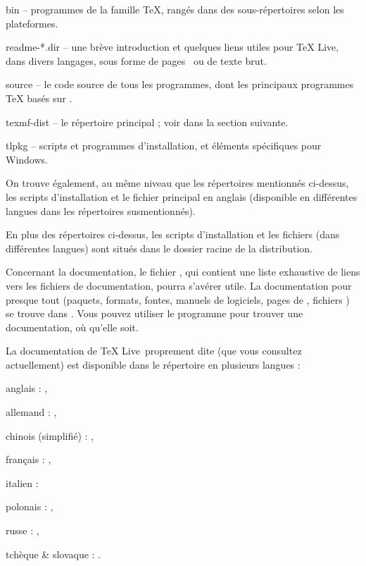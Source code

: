 \documentclass[german, english, french]{article}
\renewcommand{\TL}{\TeX{} Live\xspace}%
\begin{document}
\begin{ttdescription}
\item[bin] -- programmes de la famille \TeX{}, rangés dans des sous-répertoires
  selon les plateformes.
%
\item[readme-*.dir] -- une brève introduction et quelques liens utiles pour \TL,
  dans divers langages, sous forme de pages \HTML\ ou de texte brut.
%
\item[source] -- le code source de tous les programmes, dont les principaux
  programmes \TeX{} basés sur \Webc{}.
%
\item[texmf-dist] -- le répertoire principal ; voir  dans la
  section suivante.
%
\item[tlpkg] -- scripts et programmes d'installation, et éléments spécifiques
  pour Windows.
\end{ttdescription}

On trouve également, au même niveau que les répertoires mentionnés ci-dessus,
les scripts d'installation et le fichier  principal en anglais
(disponible en différentes langues dans les répertoires 
susmentionnés).

En plus des répertoires ci-dessus, les scripts d'installation et les fichiers
 (dans différentes langues) sont situés dans le dossier racine
de la distribution.

Concernant la documentation, le fichier , qui contient une liste
exhaustive de liens vers les fichiers de documentation, pourra s'avérer utile.
La documentation pour presque tout (paquets, formats, fontes, manuels de
logiciels, pages de , fichiers ) se trouve dans
.  Vous pouvez utiliser le programme 
pour trouver une documentation, où qu'elle soit.

La documentation de \TL\ proprement dite (que vous consultez actuellement) est
disponible dans le répertoire  en plusieurs
langues :

\begin{itemize*}
\item{anglais :} ,
\item{allemand :} ,
\item{chinois (simplifié) :} ,
\item{français :} ,
\item{italien :} 
\item{polonais :} ,
\item{russe :} ,
\item{tchèque \& slovaque :} .
\end{itemize*}
\end{document}
